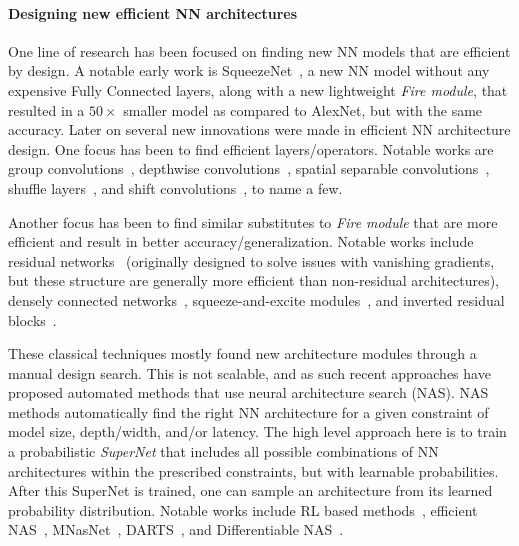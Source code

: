 \paragraph*{Designing new efficient NN architectures}
One line of research has been focused on finding new NN models
that are efficient by design. A notable early work is SqueezeNet~\cite{iandola2016squeezenet},
a new NN model without any expensive Fully Connected layers,
along with a new lightweight \emph{Fire module}, that resulted
in a $50\times$ smaller model as compared to AlexNet, but with the
same accuracy. Later on several new innovations were made in
efficient NN architecture design.
One focus has been to find efficient layers/operators.
Notable works are
group convolutions~\cite{ioannou2017deep}, 
depthwise convolutions~\cite{howard2017mobilenets},
spatial separable convolutions~\cite{mamalet2012simplifying},
shuffle layers~\cite{ma2018shufflenet},
and shift convolutions~\cite{wu2018shift}, to name a few.

Another focus has been to find similar substitutes to \emph{Fire module} that are more efficient and result in better
accuracy/generalization. Notable works include
residual networks~\cite{he2016deep} (originally designed
to solve issues with vanishing gradients, but these structure are generally more efficient
than non-residual architectures), densely connected networks~\cite{huang2017densely},
squeeze-and-excite modules~\cite{hu2018squeeze},
and inverted residual blocks~\cite{sandler2018mobilenetv2}.

These classical techniques mostly found new architecture modules
through a manual design search. 
This is not scalable, and as such recent approaches have proposed automated methods that use neural architecture search (NAS). 
NAS methods automatically find the right NN architecture for a given constraint
of model size, depth/width, and/or latency.
The high level approach here is to train a probabilistic \emph{SuperNet}
that includes all possible combinations of NN architectures within the prescribed
constraints, but with learnable probabilities. 
After this SuperNet is trained, one can sample an architecture from its learned probability distribution.
Notable works include RL based methods~\cite{zoph2016neural}, efficient NAS~\cite{pham2018efficient}, MNasNet~\cite{tan2019mnasnet}, DARTS~\cite{liu2018darts}, and Differentiable NAS~\cite{wu2019fbnet}.


